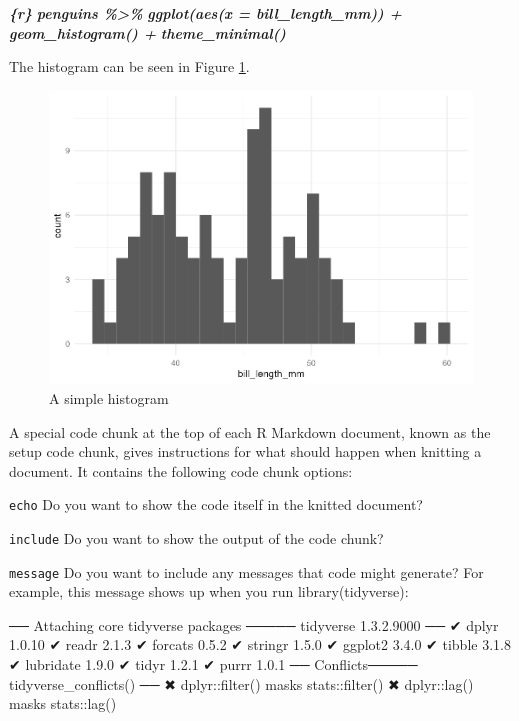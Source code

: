 \documentclass[
]{book}
\newenvironment{Shaded}{\begin{snugshade}}{\end{snugshade}}
\newcommand{\InformationTok}[1]{\textcolor[rgb]{0.56,0.35,0.01}{\textbf{\textit{#1}}}}
\newcommand{\NormalTok}[1]{#1}
\begin{document}
\begin{Shaded}
\begin{Highlighting}[]
\InformationTok{\textasciigrave{}\textasciigrave{}\textasciigrave{}\{r\}}
\InformationTok{penguins \%\textgreater{}\%}
\InformationTok{  ggplot(aes(x = bill\_length\_mm)) +}
\InformationTok{  geom\_histogram() +}
\InformationTok{  theme\_minimal()}
\InformationTok{\textasciigrave{}\textasciigrave{}\textasciigrave{}}
\end{Highlighting}
\end{Shaded}

The histogram can be seen in Figure \ref{fig:simple-histogram}.

\begin{figure}
\includegraphics[width=1\linewidth]{rmarkdown_files/figure-latex/simple-histogram-1} \caption{A simple histogram}\label{fig:simple-histogram}
\end{figure}

A special code chunk at the top of each R Markdown document, known as the setup code chunk, gives instructions for what should happen when knitting a document. It contains the following code chunk options:

\texttt{echo}
Do you want to show the code itself in the knitted document?

\texttt{include}
Do you want to show the output of the code chunk?

\texttt{message}
Do you want to include any messages that code might generate? For example, this message shows up when you run library(tidyverse):

\begin{Shaded}
\begin{Highlighting}[]
\NormalTok{── Attaching core tidyverse packages ───── tidyverse 1.3.2.9000 ──}
\NormalTok{✔ dplyr     1.0.10     ✔ readr     2.1.3 }
\NormalTok{✔ forcats   0.5.2      ✔ stringr   1.5.0 }
\NormalTok{✔ ggplot2   3.4.0      ✔ tibble    3.1.8 }
\NormalTok{✔ lubridate 1.9.0      ✔ tidyr     1.2.1 }
\NormalTok{✔ purrr     1.0.1      }
\NormalTok{── Conflicts───── tidyverse\_conflicts() ──}
\NormalTok{✖ dplyr::filter() masks stats::filter()}
\NormalTok{✖ dplyr::lag()    masks stats::lag()}
\end{Highlighting}
\end{Shaded}
\end{document}
